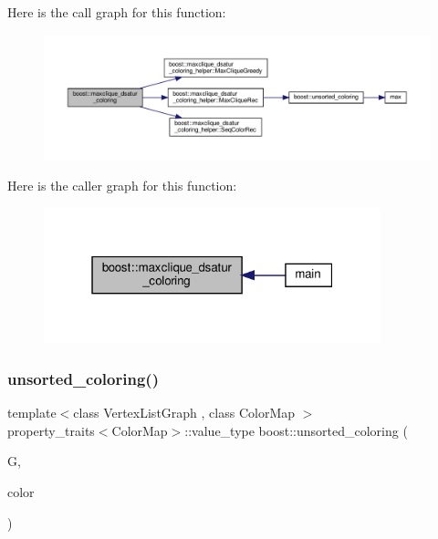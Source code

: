 Here is the call graph for this function\+:
\nopagebreak
\begin{figure}[H]
\begin{center}
\leavevmode
\includegraphics[width=350pt]{d4/da9/namespaceboost_a45bad415b0b5ee0369090a1108f6066d_cgraph}
\end{center}
\end{figure}
Here is the caller graph for this function\+:
\nopagebreak
\begin{figure}[H]
\begin{center}
\leavevmode
\includegraphics[width=277pt]{d4/da9/namespaceboost_a45bad415b0b5ee0369090a1108f6066d_icgraph}
\end{center}
\end{figure}
\mbox{\label{namespaceboost_aa5d4da27fc701c66bcda76bd3735eb05}} 
\subsubsection{\texorpdfstring{unsorted\+\_\+coloring()}{unsorted\_coloring()}}
{\footnotesize\ttfamily template$<$class Vertex\+List\+Graph , class Color\+Map $>$ \\
property\+\_\+traits$<$Color\+Map$>$\+::value\+\_\+type boost\+::unsorted\+\_\+coloring (\begin{DoxyParamCaption}\item[{const Vertex\+List\+Graph \&}]{G,  }\item[{Color\+Map}]{color }\end{DoxyParamCaption})}



